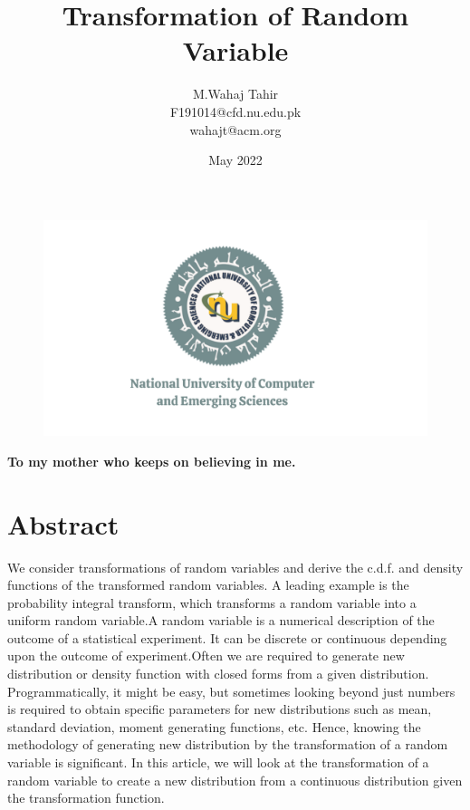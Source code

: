 \documentclass[12pt]{article}
\title{\textbf{Transformation of Random Variable\\}}
\author{M.Wahaj Tahir\\F191014@cfd.nu.edu.pk\\wahajt@acm.org}
\date{May 2022}
\begin{document}
\maketitle
\begin{figure}[b]
\centering
 \includegraphics[scale=0.20]{Fast-Nuces.png}
\end{figure}
\clearpage

\large 
\clearpage
\begin{center}
\centering
    \textbf{To my mother who keeps on believing in me.}
\end{center}
    

\clearpage
\tableofcontents
\clearpage

\section{Abstract}
We consider transformations of random variables and derive the c.d.f. and density functions of the transformed random variables. A leading example is the probability integral transform, which transforms a random variable into a uniform random variable.A random variable is a numerical description of the outcome of a statistical experiment. It can be discrete or continuous depending upon the outcome of experiment.Often we are required to generate new distribution or density function with closed forms from a given
distribution. Programmatically, it might be easy, but sometimes looking beyond just numbers is
required to obtain specific parameters for new distributions such as mean, standard deviation, moment
generating functions, etc. Hence, knowing the methodology of generating new distribution by the
transformation of a random variable is significant. In this article, we will look at the transformation of
a random variable to create a new distribution from a continuous distribution given the transformation
function.
\clearpage
\end{document}
